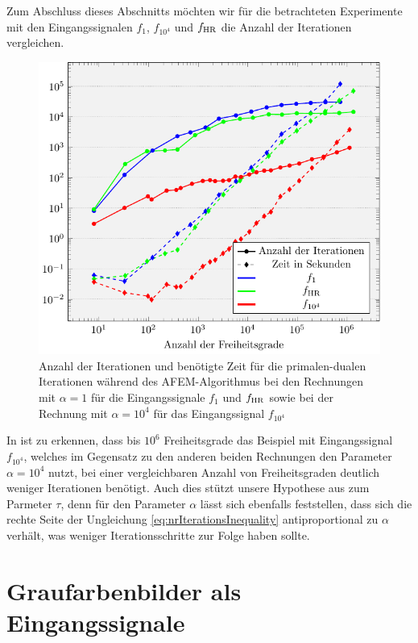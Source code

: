Zum Abschluss dieses Abschnitts möchten wir für die betrachteten Experimente
mit den Eingangssignalen $f_1$, $f_{10^4}$ und $f_\textup{HR}$ die Anzahl der
Iterationen vergleichen.
\begin{figure}[p]
  \centering
  \includegraphics[width=.8\linewidth]
    {pictures/chapExperiments/secConclusion/nrIterComp/exactSol/misc.pdf}
  \caption{Anzahl der Iterationen und benötigte Zeit für die primalen-dualen
    Iterationen während des AFEM-Algorithmus bei den Rechnungen mit $\alpha=1$
    für die Eingangssignale $f_1$ und $f_\textup{HR}$ sowie bei der Rechnung mit
    $\alpha=10^4$ für das Eingangssignal $f_{10^4}$} 
  \label{fig:inSiNrIterComparison}
\end{figure}
In  ist zu erkennen, dass bis $10^6$
Freiheitsgrade das Beispiel mit Eingangssignal $f_{10^4}$, welches im Gegensatz
zu den anderen beiden Rechnungen den Parameter $\alpha=10^4$ nutzt, bei einer
vergleichbaren Anzahl von Freiheitsgraden deutlich weniger Iterationen
benötigt. 
Auch dies stützt unsere Hypothese aus  zum
Parmeter $\tau$, denn für den Parameter $\alpha$ lässt sich ebenfalls
feststellen, dass sich die rechte Seite der Ungleichung
\eqref{eq:nrIterationsInequality} antiproportional zu $\alpha$
verhält, was weniger Iterationsschritte zur Folge haben sollte. 


\section{Graufarbenbilder als Eingangssignale}
\label{sec:grayscalePicturesAsInputSignal}

